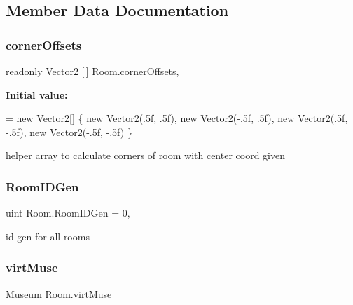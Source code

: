 \subsection{Member Data Documentation}
\mbox{\label{class_room_aeb66d344acdc21822d0598beb0d7d71b}} 
\subsubsection{\texorpdfstring{corner\+Offsets}{cornerOffsets}}
{\footnotesize\ttfamily readonly Vector2 \mbox{[}$\,$\mbox{]} Room.\+corner\+Offsets\hspace{0.3cm}{\ttfamily [static]}, {\ttfamily [private]}}

{\bfseries Initial value\+:}
\begin{DoxyCode}
= \textcolor{keyword}{new} Vector2[]
    \{
        \textcolor{keyword}{new} Vector2(.5f, .5f),
        \textcolor{keyword}{new} Vector2(-.5f, .5f),
        \textcolor{keyword}{new} Vector2(.5f, -.5f),
        \textcolor{keyword}{new} Vector2(-.5f, -.5f)
    \}
\end{DoxyCode}


helper array to calculate corners of room with center coord given 

\mbox{\label{class_room_a2e52c767e772a29e39cb5598aea534fb}} 
\subsubsection{\texorpdfstring{Room\+I\+D\+Gen}{RoomIDGen}}
{\footnotesize\ttfamily uint Room.\+Room\+I\+D\+Gen = 0\hspace{0.3cm}{\ttfamily [static]}, {\ttfamily [private]}}



id gen for all rooms 

\mbox{\label{class_room_a7b3cf4bdc95a8c1bf69ae4ff71b4f02a}} 
\subsubsection{\texorpdfstring{virt\+Muse}{virtMuse}}
{\footnotesize\ttfamily \mbox{\hyperlink{class_museum}{Museum}} Room.\+virt\+Muse\hspace{0.3cm}{\ttfamily [private]}}



